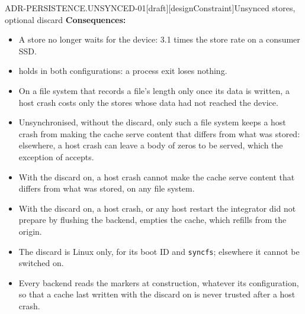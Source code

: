 \begin{requirement}{ADR-PERSISTENCE.UNSYNCED-01}[draft][designConstraint]{Unsynced stores, optional discard}
  \textbf{Consequences:}
  \begin{itemize}
    \item[+] A store no longer waits for the device: 3.1 times the store rate
      on a consumer SSD.
    \item[+]  holds in both
      configurations: a process exit loses nothing.
    \item[+] On a file system that records a file's length only once its
      data is written, a host crash costs only the stores whose data had
      not reached the device.
    \item[--] Unsynchronised, without the discard, only such a file system
      keeps a host crash from making the cache serve content that differs
      from what was stored: elsewhere, a host crash can leave a body of
      zeros to be served, which the exception of
       accepts.
    \item[+] With the discard on, a host crash cannot make the cache serve
      content that differs from what was stored, on any file system.
    \item[--] With the discard on, a host crash, or any host restart the
      integrator did not prepare by flushing the backend, empties the cache,
      which refills from the origin.
    \item[--] The discard is Linux only, for its boot ID and
      \texttt{syncfs}; elsewhere it cannot be switched on.
    \item[--] Every backend reads the markers at construction, whatever its
      configuration, so that a cache last written with the discard on is
      never trusted after a host crash.
  \end{itemize}



\end{requirement}

